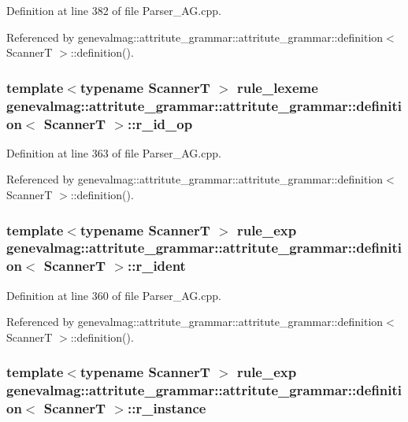 Definition at line 382 of file Parser\_\-AG.cpp.

Referenced by genevalmag::attritute\_\-grammar::attritute\_\-grammar::definition$<$ ScannerT $>$::definition().\hypertarget{structgenevalmag_1_1attritute__grammar_1_1definition_c8d56e9b95eb4f9999c3697d21196118}{
\subsubsection[{r\_\-id\_\-op}]{\setlength{\rightskip}{0pt plus 5cm}template$<$typename ScannerT $>$ {\bf rule\_\-lexeme} genevalmag::attritute\_\-grammar::attritute\_\-grammar::definition$<$ ScannerT $>$::{\bf r\_\-id\_\-op}}}
\label{structgenevalmag_1_1attritute__grammar_1_1definition_c8d56e9b95eb4f9999c3697d21196118}




Definition at line 363 of file Parser\_\-AG.cpp.

Referenced by genevalmag::attritute\_\-grammar::attritute\_\-grammar::definition$<$ ScannerT $>$::definition().\hypertarget{structgenevalmag_1_1attritute__grammar_1_1definition_a9e37bdb635aa2ceb174661281b104a3}{
\subsubsection[{r\_\-ident}]{\setlength{\rightskip}{0pt plus 5cm}template$<$typename ScannerT $>$ {\bf rule\_\-exp} genevalmag::attritute\_\-grammar::attritute\_\-grammar::definition$<$ ScannerT $>$::{\bf r\_\-ident}}}
\label{structgenevalmag_1_1attritute__grammar_1_1definition_a9e37bdb635aa2ceb174661281b104a3}




Definition at line 360 of file Parser\_\-AG.cpp.

Referenced by genevalmag::attritute\_\-grammar::attritute\_\-grammar::definition$<$ ScannerT $>$::definition().\hypertarget{structgenevalmag_1_1attritute__grammar_1_1definition_212aa9a237c1ee91689ed06f106ac112}{
\subsubsection[{r\_\-instance}]{\setlength{\rightskip}{0pt plus 5cm}template$<$typename ScannerT $>$ {\bf rule\_\-exp} genevalmag::attritute\_\-grammar::attritute\_\-grammar::definition$<$ ScannerT $>$::{\bf r\_\-instance}}}
\label{structgenevalmag_1_1attritute__grammar_1_1definition_212aa9a237c1ee91689ed06f106ac112}




